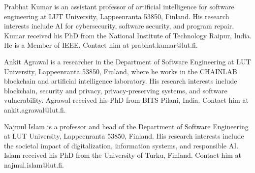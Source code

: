 \documentclass[10pt,journal,compsoc]{IEEEtran}
\begin{document}
\begin{IEEEbiographynophoto}{Prabhat Kumar}
is an assistant professor of artificial intelligence for software engineering at
LUT University, Lappeenranta 53850, Finland. His research interests include AI
for cybersecurity, software security, and program repair. Kumar received his PhD
from the National Institute of Technology Raipur, India. He is a Member of IEEE.
Contact him at prabhat.kumar@lut.fi.
\end{IEEEbiographynophoto}

\begin{IEEEbiographynophoto}{Ankit Agrawal}
is a researcher in the Department of Software Engineering at LUT University,
Lappeenranta 53850, Finland, where he works in the CHAINLAB blockchain and
artificial intelligence laboratory. His research interests include blockchain,
security and privacy, privacy-preserving systems, and software vulnerability.
Agrawal received his PhD from BITS Pilani, India. Contact him at
ankit.agrawal@lut.fi.
\end{IEEEbiographynophoto}

\begin{IEEEbiographynophoto}{Najmul Islam}
is a professor and head of the Department of Software Engineering at LUT
University, Lappeenranta 53850, Finland. His research interests include the
societal impact of digitalization, information systems, and responsible AI. Islam
received his PhD from the University of Turku, Finland. Contact him at
najmul.islam@lut.fi.
\end{IEEEbiographynophoto}
\end{document}
